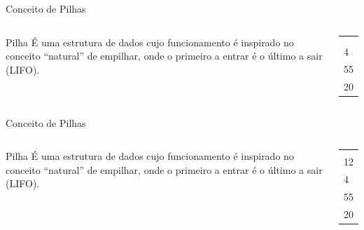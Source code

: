 \documentclass[12pt,table,xcolor={dvipsnames}]{beamer}
\begin{document}
\begin{frame}{Conceito de Pilhas}
\begin{columns}
\begin{block}{Pilha}
É uma estrutura de dados cujo funcionamento é inspirado no conceito “natural” de empilhar, onde o primeiro a entrar é o último a sair (LIFO).
\end{block}
\begin{center}
{
\begin{tabular}{ |p{.5cm}| }
\hline
 \\ \hline
 \\ \hline
 \\ \hline
4 \\ \hline
55 \\ \hline
20  \\ \hline
\end{tabular}
}
\end{center}
\end{columns}
\end{frame}

\begin{frame}{Conceito de Pilhas}
\begin{columns}
\begin{block}{Pilha}
É uma estrutura de dados cujo funcionamento é inspirado no conceito “natural” de empilhar, onde o primeiro a entrar é o último a sair (LIFO).
\end{block}
\begin{center}
{
\begin{tabular}{ |p{.5cm}| }
\hline
 \\ \hline
 \\ \hline
12 \\ \hline
4 \\ \hline
55 \\ \hline
20  \\ \hline
\end{tabular}
}
\end{center}
\end{columns}
\end{frame}
\end{document}
